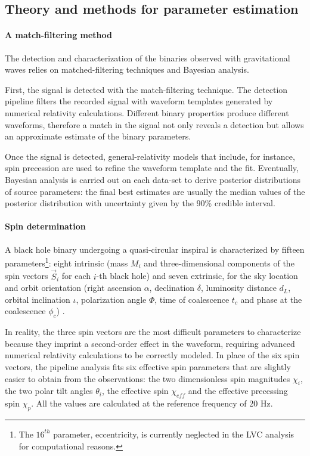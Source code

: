 \documentclass[a4paper,titlepage]{book}     	%
\begin{document}
\subsection{Theory and methods for parameter estimation}\label{subsec:GWtheorymethod}
\paragraph{A match-filtering method} The detection and characterization of the binaries observed with gravitational waves relies on matched-filtering techniques and Bayesian analysis. 

First, the signal is detected with the match-filtering technique. The detection pipeline filters the recorded signal with waveform templates generated by numerical relativity calculations. Different binary properties produce different waveforms, therefore a match in the signal not only reveals a detection but allows an approximate estimate of the binary parameters.

Once the signal is detected, general-relativity models that include, for instance, spin precession are used to refine the waveform template and the fit. Eventually, Bayesian analysis is carried out on each data-set to derive posterior distributions of source parameters: the final best estimates are usually the median values of the posterior distribution with uncertainty given by the 90\% credible interval.

\paragraph{Spin determination} A black hole binary undergoing a quasi-circular inspiral is characterized by fifteen parameters\footnote{The $16^{th}$ parameter, eccentricity, is currently neglected in the LVC analysis for computational reasons.}: eight intrinsic (mass $M_i$ and three-dimensional components of the spin vectors $\vec{S}_i$ for each $i$-th black hole) and seven extrinsic, for the sky location and orbit orientation (right ascension $\alpha$, declination $\delta$, luminosity distance $d_L$, orbital inclination $\iota$, polarization angle $\Phi$, time of coalescence $t_c$ and phase at the coalescence $\phi_c$) \cite{GWTC-1}.

In reality, the three spin vectors are the most difficult parameters to characterize because they imprint a second-order effect in the waveform, requiring advanced numerical relativity calculations to be correctly modeled. In place of the six spin vectors, the pipeline analysis fits six effective spin parameters that are slightly easier to obtain from the observations: the two dimensionless spin magnitudes $\chi_i$, the two polar tilt angles $\theta_i$, the effective spin $\chi_{eff}$ and the effective precessing spin $\chi_p$. All the values are calculated at the reference frequency of 20 Hz.
\end{document}
